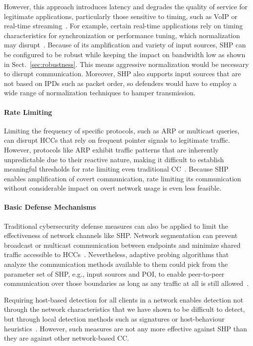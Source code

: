 \documentclass[journal]{IEEEtran}
\begin{document}
However, this approach introduces latency and degrades the quality of service for legitimate applications, particularly those sensitive to timing, such as VoIP or real-time streaming~\cite{Epishkina2019Timing}. For example, certain real-time applications rely on timing characteristics for synchronization or performance tuning, which normalization may disrupt~\cite{2008On}. Because of its amplification and variety of input sources, \ac{SHP} can be configured to be robust while keeping the impact on bandwidth low as shown in Sect.~\ref{sec:robustness}. This means aggressive normalization would be necessary to disrupt communication. Moreover, \ac{SHP} also supports input sources that are not based on \ac{IPD}s such as packet order, so defenders would have to employ a wide range of normalization techniques to hamper transmission.

\paragraph{Rate Limiting}
Limiting the frequency of specific protocols, such as ARP or multicast queries, can disrupt \ac{HCC}s that rely on frequent pointer signals to legitimate traffic. However, protocols like ARP exhibit traffic patterns that are inherently unpredictable due to their reactive nature, making it difficult to establish meaningful thresholds for rate limiting even traditional \ac{CC}~\cite{Sun2021Suspicious,noratelimiting11}. Because \ac{SHP} enables amplification of covert communication, rate limiting its communication without considerable impact on overt network usage is even less feasible. 

\paragraph{Basic Defense Mechanisms}
Traditional cybersecurity defense measures can also be applied to limit the effectiveness of network channels like \ac{SHP}. Network segmentation can prevent broadcast or multicast communication between endpoints and minimize shared traffic accessible to \ac{HCC}s~\cite{Kogos2021Prospective,Ondov2022Covert}. Nevertheless, adaptive probing algorithms that analyze the communication methods available to them could pick from the parameter set of \ac{SHP}, e.g., input sources and POI, to enable peer-to-peer communication over those boundaries as long as any traffic at all is still allowed~\cite{Yarochkin2009Introducing,Bortolameotti2019VictimAware}.

Requiring host-based detection for all clients in a network enables detection not through the network characteristics that we have shown to be difficult to detect, but through local detection methods such as signatures or host-behaviour heuristics~\cite{Ondov2022Covert,Joe2021HostBased}. However, such measures are not any more effective against \ac{SHP} than they are against other network-based \ac{CC}.
\end{document}
